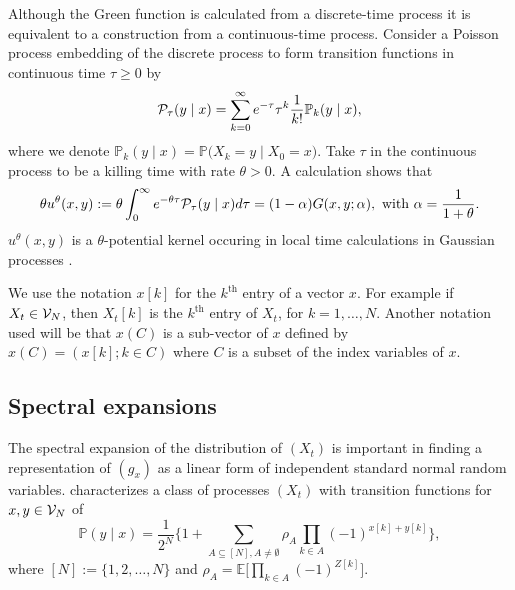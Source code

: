 \documentclass[preprint,11pt]{elsarticle}
\theoremstyle{remark}
\begin{document}
Although the Green function is calculated from a discrete-time process it is equivalent to a construction from a continuous-time process. Consider a Poisson process embedding of the discrete process to form transition functions in continuous time $\tau \geq 0$ by
\begin{equation*}
{\cal P}_\tau(y\mid x) = \sum_{k=0}^\infty e^{-\tau}\tau^k\frac{1}{k!}
\mathbb{P}_k(y\mid x ),
\label{ctstime:00}
\end{equation*}
where we denote $\mathbb{P}_k(y\mid x )=\mathbb{P}\big (X_k=y\mid X_0=x)$.
Take $\tau$ in the continuous process to be a killing time with rate  $\theta > 0$. A calculation shows that
\begin{equation*}
\theta u^\theta(x,y) := \theta\int_0^\infty e^{-\theta\tau}{\cal P}_\tau(y\mid x)d\tau
= (1-\alpha) G(x,y;\alpha),\text{~with~}\alpha = \frac{1}{1+\theta}.
\label{Greencts:000}
\end{equation*}
$u^\theta(x,y)$ is a $\theta$-potential kernel occuring in local time calculations in Gaussian processes \citep{MR2006}.

We use the notation $x[k]$ for the $k^{\text{th}}$ entry of a vector $x$. For example if $X_t\in {\cal V}_N$, then $X_t[k]$ is the $k^{\text{th}}$ entry of $X_t$, for $k=1,\ldots, N$. Another notation used will be that $x(C)$ is a sub-vector of $x$ defined by $x(C) = (x[k];k\in C)$ where $C$ is a subset of the index variables of $x$.
\subsection{Spectral expansions}
The spectral expansion of the distribution of $(X_t)$ is important in finding a representation of $(g_x)$ as a linear form of independent standard normal random variables.
\cite{CG2021} characterizes a class of processes $(X_t)$ with transition functions
 for $x,y\in {\cal V}_N$ of
 \begin{equation}
\mathbb{P}(y\mid x) = \frac{1}{2^N}\Big \{1 + \sum_{A\subseteq [N], A \ne \emptyset}
 \rho_A\prod_{k\in A}(-1)^{x[k]+y[k]}\Big \},
 \label{transition:00}
 \end{equation}
 where $[N]:=\{1,2,\ldots,N\}$ and
$ \rho_A = \mathbb{E}\Big [\prod_{k\in A}(-1)^{Z[k]}\Big ]$. 
 
\end{document}

